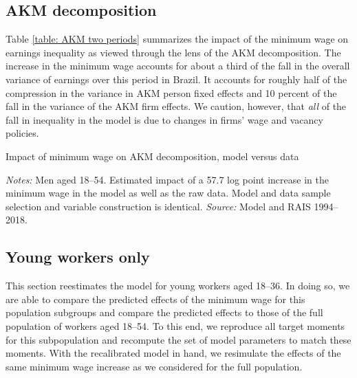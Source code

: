 \clearpage
\subsection{AKM decomposition\label{app_subsec:akm_decomposition}}
Table \ref{table: AKM two periods} summarizes the impact of the minimum wage on earnings inequality as viewed through the lens of the AKM decomposition. The increase in the minimum wage accounts for about a third of the fall in the overall variance of earnings over this period in Brazil. It accounts for roughly half of the compression in the variance in AKM person fixed effects and 10 percent of the fall in the variance of the AKM firm effects. We caution, however, that \textit{all} of the fall in inequality in the model is due to changes in firms' wage and vacancy policies.

\begin{table}[!htb]
  \centering
  \caption{Impact of minimum wage on AKM decomposition, model versus data\label{table: AKM two periods}}
  
  \posttabvspace
  \begin{minipage}[t]{1\columnwidth}%
    \begin{spacing}{0.75}
      \emph{\scriptsize{}Notes: }{\scriptsize{}Men aged 18--54. Estimated impact of a 57.7 log point increase in the minimum wage in the model as well as the raw data. Model and data sample selection and variable construction is identical. %
      \emph{\scriptsize{}Source: } Model and RAIS 1994--2018.}
    \end{spacing}
  \end{minipage}
\end{table}



\clearpage
\subsection{Young workers only\label{app_subsec:young_only}}

This section reestimates the model for young workers aged 18--36. In doing so, we are able to compare the predicted effects of the minimum wage for this population subgroups and compare the predicted effects to those of the full population of workers aged 18--54. To this end, we reproduce all target moments for this subpopulation and recompute the set of model parameters to match these moments. With the recalibrated model in hand, we resimulate the effects of the same minimum wage increase as we considered for the full population.

